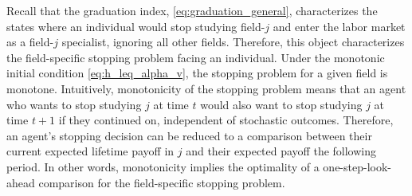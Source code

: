 Recall that the graduation index, \eqref{eq:graduation_general}, characterizes the states where an individual would stop studying field-$j$ and enter the labor market as a field-$j$ specialist, ignoring all other fields.
Therefore, this object characterizes the field-specific stopping problem facing an individual.
Under the monotonic initial condition \eqref{eq:h_leq_alpha_v}, the stopping problem for a given field is monotone.
Intuitively, monotonicity of the stopping problem means that an agent who wants to stop studying $j$ at time $t$ would also want to stop studying $j$ at time $t+1$ if they continued on, independent of stochastic outcomes.
Therefore, an agent's stopping decision can be reduced to a comparison between their current expected lifetime payoff in $j$ and their expected payoff the following period.
In other words, monotonicity implies the optimality of a one-step-look-ahead comparison for the field-specific stopping problem.



